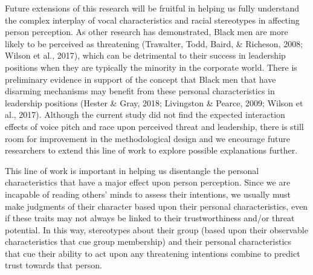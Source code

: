 \documentclass[
  english,
  man, noextraspace,floatsintext]{apa6}
\begin{document}
Future extensions of this research will be fruitful in helping us fully understand the complex interplay of vocal characteristics and racial stereotypes in affecting person perception. As other research has demonstrated, Black men are more likely to be perceived as threatening (Trawalter, Todd, Baird, \& Richeson, 2008; Wilson et al., 2017), which can be detrimental to their success in leadership positions when they are typically the minority in the corporate world. There is preliminary evidence in support of the concept that Black men that have disarming mechanisms may benefit from these personal characteristics in leadership positions (Hester \& Gray, 2018; Livingston \& Pearce, 2009; Wilson et al., 2017). Although the current study did not find the expected interaction effects of voice pitch and race upon perceived threat and leadership, there is still room for improvement in the methodological design and we encourage future researchers to extend this line of work to explore possible explanations further.

This line of work is important in helping us disentangle the personal characteristics that have a major effect upon person perception. Since we are incapable of reading others' minds to assess their intentions, we usually must make judgments of their character based upon their personal characteristics, even if these traits may not always be linked to their trustworthiness and/or threat potential. In this way, stereotypes about their group (based upon their observable characteristics that cue group membership) and their personal characteristics that cue their ability to act upon any threatening intentions combine to predict trust towards that person.
\end{document}
